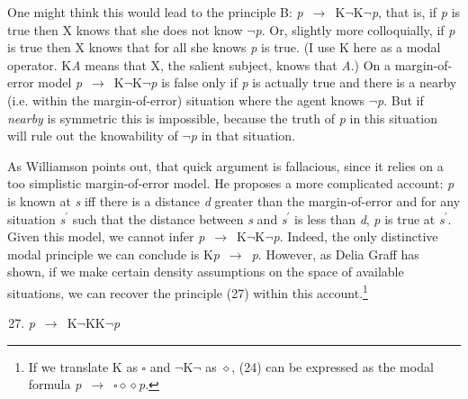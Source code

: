 One might think this would lead to the principle B:
\emph{p}~\({\rightarrow}\)~K\(\neg\)K\(\neg\)\emph{p}, that is, if
\emph{p} is true then X knows that she does not know \(\neg\)\emph{p}.
Or, slightly more colloquially, if \emph{p} is true then X knows that
for all she knows \emph{p} is true. (I use K here as a modal operator.
K\emph{A} means that X, the salient subject, knows that \emph{A}.) On a
margin-of-error model
\emph{p}~\({\rightarrow}\)~K\(\neg\)K\(\neg\)\emph{p} is false only if
\emph{p} is actually true and there is a nearby (i.e. within the
margin-of-error) situation where the agent knows \(\neg\)\emph{p}. But
if \emph{nearby} is symmetric this is impossible, because the truth of
\emph{p} in this situation will rule out the knowability of
\(\neg\)\emph{p} in that situation.

As Williamson points out, that quick argument is fallacious, since it
relies on a too simplistic margin-of-error model. He proposes a more
complicated account: \emph{p} is known at \emph{s} iff there is a
distance \emph{d} greater than the margin-of-error and for any situation
\emph{s}\(^\prime\) such that the distance between \emph{s} and
\emph{s}\(^\prime\) is less than \emph{d}, \emph{p} is true at
\emph{s}\(^\prime\). Given this model, we cannot infer
\emph{p}~\({\rightarrow}\)~K\(\neg\)K\(\neg\)\emph{p}. Indeed, the only
distinctive modal principle we can conclude is
K\emph{p}~\({\rightarrow}\)~\emph{p}. However, as Delia Graff
\citet{Fara2002} has shown, if we make certain density assumptions on
the space of available situations, we can recover the principle (27)
within this account.\footnote{If we translate K as \(\square\) and
  \(\neg\)K\(\neg\) as \(\diamond\), (24) can be expressed as the modal
  formula
  \emph{p}~\({\rightarrow}\)~\(\square\)\(\diamond\)\(\diamond\)\emph{p}.}

\begin{enumerate}
\setcounter{enumi}{26}
\item
  \emph{p}~\({\rightarrow}\)~K\(\neg\)KK\(\neg\)\emph{p}
\end{enumerate}

